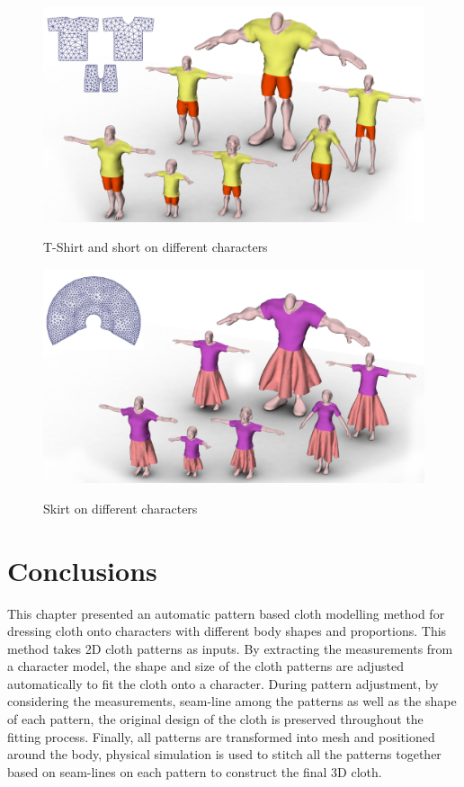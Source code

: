 \begin{figure}[H]
	\centering
	\includegraphics[width=1.0\columnwidth]{../images/7_characters_dress2}\\[0.1cm]
    \caption{T-Shirt and short on different characters}
    \label{figure:seven_characters_dress2}
\end{figure}

\begin{figure}[H]
	\centering
	\includegraphics[width=1.0\columnwidth]{../images/7_characters_dress3}\\[0.1cm]
    \caption{Skirt on different characters}
    \label{figure:seven_characters_dress3}
\end{figure}


\section{Conclusions}

This chapter presented an automatic pattern based cloth modelling method for dressing cloth onto characters with different body shapes and proportions. This method takes 2D cloth patterns as inputs. By extracting the measurements from a character model, the shape and size of the cloth patterns are adjusted automatically to fit the cloth onto a character. During pattern adjustment, by considering the measurements, seam-line among the patterns as well as the shape of each pattern, the original design of the cloth is preserved throughout the fitting process. Finally, all patterns are transformed into mesh and positioned around the body, physical simulation is used to stitch all the patterns together based on seam-lines on each pattern to construct the final 3D cloth. 

